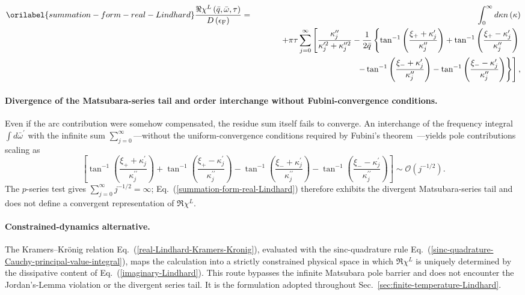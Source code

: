 \documentclass[aps,showkeys,noshowpacs,superscriptaddress,pre,preprint]{revtex4-2}
\let\label\orilabel
\begin{document}
\begin{eqnarray}
\label{summation-form-real-Lindhard}
\frac{\Re \chi^L \left( \bar{q}, \bar{\omega}, \tau \right)}{D\left( \epsilon_\mathrm{F} \right)}
&=& \int_0^\infty d\kappa n\left( \kappa \right) 
\\
& &
+ \pi \tau \sum_{j = 0}^{\infty} \left[
\frac{\kappa_j^{\prime\prime}}{\kappa_j^{\prime 2} + \kappa_j^{\prime\prime 2}}
- \frac{1}{2 \bar{q}} \left\{
\tan^{-1}\left( \frac{\xi_+ + \kappa_j^\prime}{\kappa_j^{\prime\prime}} \right)
+\tan^{-1}\left( \frac{\xi_+ - \kappa_j^\prime}{\kappa_j^{\prime\prime}} \right)
\right. \right.
\nonumber \\
& & \qquad \qquad \qquad \qquad \qquad \qquad
\left. \left.
-\tan^{-1}\left( \frac{\xi_- + \kappa_j^\prime}{\kappa_j^{\prime\prime}} \right)
-\tan^{-1}\left( \frac{\xi_- - \kappa_j^\prime}{\kappa_j^{\prime\prime}} \right)
\right\}
\right] ,
\nonumber
\end{eqnarray}

\paragraph{Divergence of the Matsubara-series tail and order interchange without Fubini-convergence conditions.}
Even if the arc contribution were somehow compensated,
the residue sum itself fails to converge.
An interchange of the frequency integral $\int d\bar{\omega}^\prime$
with the infinite sum $\sum_{j=0}^{\infty}$---without the uniform-convergence conditions
required by Fubini's theorem~\cite{Rudin1976}---yields pole contributions scaling as
\begin{equation}
\left[
\tan^{-1}\!\left( \frac{\xi_+ + \kappa_j^\prime}{\kappa_j^{\prime\prime}} \right)
+ \tan^{-1}\!\left( \frac{\xi_+ - \kappa_j^\prime}{\kappa_j^{\prime\prime}} \right)
- \tan^{-1}\!\left( \frac{\xi_- + \kappa_j^\prime}{\kappa_j^{\prime\prime}} \right)
- \tan^{-1}\!\left( \frac{\xi_- - \kappa_j^\prime}{\kappa_j^{\prime\prime}} \right)
\right]
\sim \mathcal{O}\!\left(j^{-1/2}\right) .
\end{equation}
The $p$-series test gives $\sum_{j=0}^{\infty} j^{-1/2} = \infty$;
Eq.~(\ref{summation-form-real-Lindhard}) therefore exhibits the divergent Matsubara-series tail
and does not define a convergent representation of $\Re\chi^L$.

\paragraph{Constrained-dynamics alternative.}
The Kramers--Kr\"onig relation Eq.~(\ref{real-Lindhard-Kramers-Kronig}),
evaluated with the sinc-quadrature rule Eq.~(\ref{sinc-quadrature-Cauchy-principal-value-integral}),
maps the calculation into a strictly constrained physical space in which $\Re\chi^L$
is uniquely determined by the dissipative content of Eq.~(\ref{imaginary-Lindhard}).
This route bypasses the infinite Matsubara pole barrier and does not encounter
the Jordan's-Lemma violation or the divergent series tail.
It is the formulation adopted throughout Sec.~\ref{sec:finite-temperature-Lindhard}.
\end{document}
